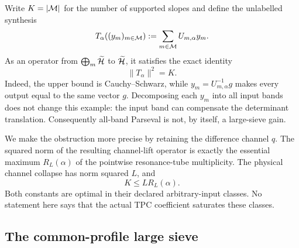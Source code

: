 Write \(K=|\mathcal M|\) for the number of supported slopes and define the
unlabelled synthesis
\begin{equation}
 T_\alpha((y_m)_{m\in\mathcal M})
 :=\sum_{m\in\mathcal M}U_{m,\alpha}y_m.
 \label{eq:tpc48-intro-unrestricted-synthesis}
\end{equation}
As an operator from \(\bigoplus_m\widetilde{\mathcal H}\) to
\(\widetilde{\mathcal H}\), it satisfies the exact identity
\begin{equation}
 \boxed{\|T_\alpha\|^2=K.}
 \label{eq:tpc48-intro-unrestricted-norm}
\end{equation}
Indeed, the upper bound is Cauchy--Schwarz, while
\(y_m=U_{m,\alpha}^{-1}g\) makes every output equal to the same vector
\(g\).  Decomposing each \(y_m\) into all input bands does not change
this example: the input band can compensate the determinant
translation.  Consequently all-band Parseval is not, by itself, a
large-sieve gain.

We make the obstruction more precise by retaining the difference
channel \(q\).  The squared norm of the resulting channel-lift operator
is exactly the essential maximum \(R_L(\alpha)\) of the pointwise
resonance-tube multiplicity.  The physical channel collapse has norm
squared \(L\), and
\begin{equation}
 K\le L R_L(\alpha).
 \label{eq:tpc48-intro-factor-barrier}
\end{equation}
Both constants are optimal in their declared arbitrary-input classes.
No statement here says that the actual TPC coefficient saturates these
classes.

\subsection{The common-profile large sieve}

